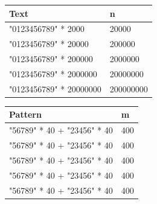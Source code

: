 \documentclass[11pt]{article}
\begin{document}

                \begin{table}[!htb]
                        \begin{minipage}{.5\linewidth}
                            \centering
                                \begin{tabular}{ll}
                                    \textbf{Text} & \textbf{n} \\
                                    \hline
                                    "0123456789" * 2000 & 20000 \\
                                    "0123456789" * 20000 & 200000 \\
                                    "0123456789" * 200000 & 2000000 \\
                                    "0123456789" * 2000000 & 20000000 \\
                                    "0123456789" * 20000000 & 200000000 \\
                                \end{tabular}
                        \end{minipage}%
                        \begin{minipage}{.5\linewidth}
                            \centering
                                \begin{tabular}{ll}
                                    \textbf{Pattern} & \textbf{m} \\
                                    \hline
                                    "56789" * 40 + "23456" * 40 & 400 \\
                                    "56789" * 40 + "23456" * 40 & 400 \\
                                    "56789" * 40 + "23456" * 40 & 400 \\
                                    "56789" * 40 + "23456" * 40 & 400 \\
                                    "56789" * 40 + "23456" * 40 & 400 \\
                                \end{tabular}
                        \end{minipage}
                    \label{tab:test_2_1}
                \end{table}
\end{document}
